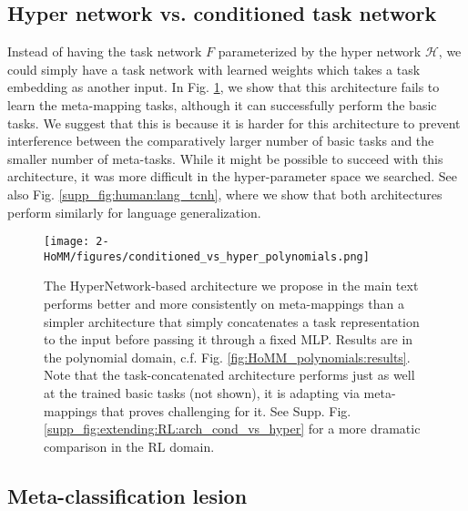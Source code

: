 \subsection{Hyper network vs. conditioned task network} \label{app_lesion_results_hyper}
Instead of having the task network $F$ parameterized by the hyper network $\mathcal{H}$, we could simply have a task network with learned weights which takes a task embedding as another input. In Fig. \ref{supp_fig:HoMM_arch_cond_vs_hyper}, we show that this architecture fails to learn the meta-mapping tasks, although it can successfully perform the basic tasks. We suggest that this is because it is harder for this architecture to prevent interference between the comparatively larger number of basic tasks and the smaller number of meta-tasks. While it might be possible to succeed with this architecture, it was more difficult in the hyper-parameter space we searched. See also Fig. \ref{supp_fig:human:lang_tcnh}, where we show that both architectures perform similarly for language generalization. \par 

\begin{figure}[H]
\centering
\texttt{[image: 2-HoMM/figures/conditioned\_vs\_hyper\_polynomials.png]}
\caption[The HyperNetwork-based architecture we propose outperforms a simpler architecture.]{The HyperNetwork-based architecture we propose in the main text performs better and more consistently on meta-mappings than a simpler architecture that simply concatenates a task representation to the input before passing it through a fixed MLP. Results are in the polynomial domain, c.f. Fig. \ref{fig:HoMM_polynomials:results}. Note that the task-concatenated architecture performs just as well at the trained basic tasks (not shown), it is adapting via meta-mappings that proves challenging for it. See Supp. Fig. \ref{supp_fig:extending:RL:arch_cond_vs_hyper} for a more dramatic comparison in the RL domain. }\label{supp_fig:HoMM_arch_cond_vs_hyper}
\end{figure}

\subsection{Meta-classification lesion} \label{app:homm:metaclass_lesion}

